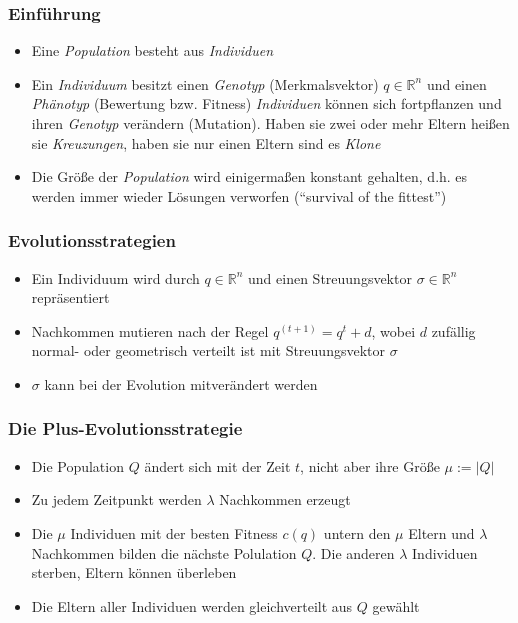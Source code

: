 \subsubsection{Einführung}
\begin{itemize}
	\item Eine \textit{Population} besteht aus \textit{Individuen}
	\item Ein \textit{Individuum} besitzt einen \textit{Genotyp} (Merkmalsvektor) \(q \in \mathbb{R}^n\) und einen \textit{Phänotyp} (Bewertung bzw. Fitness)
	\textit{Individuen} können sich fortpflanzen und ihren \textit{Genotyp} verändern (Mutation). Haben sie zwei oder mehr Eltern heißen sie \textit{Kreuzungen}, haben sie nur einen Eltern sind es \textit{Klone}
	\item Die Größe der \textit{Population} wird einigermaßen konstant gehalten, d.h. es werden immer wieder Lösungen verworfen ("`survival of the fittest"')
\end{itemize}

\subsubsection{Evolutionsstrategien}
\begin{itemize}
	\item Ein Individuum wird durch \(q \in \mathbb{R}^n\) und einen Streuungsvektor \(\sigma \in \mathbb{R}^n\) repräsentiert
	\item Nachkommen mutieren nach der Regel \(q^{(t+1)} = q^t+d\), wobei \(d\) zufällig normal- oder geometrisch verteilt ist mit Streuungsvektor \(\sigma\)
	\item \(\sigma\) kann bei der Evolution mitverändert werden
\end{itemize}

\subsubsection{Die Plus-Evolutionsstrategie}
\begin{itemize}
	\item Die Population \(Q\) ändert sich mit der Zeit \(t\), nicht aber ihre Größe \(\mu := |Q|\)
	\item Zu jedem Zeitpunkt werden \(\lambda\) Nachkommen erzeugt
	\item Die \(\mu\) Individuen mit der besten Fitness \(c(q)\) untern den \(\mu\) Eltern und \(\lambda\) Nachkommen bilden die nächste Polulation \(Q\). Die anderen \(\lambda\) Individuen sterben, Eltern können überleben
	\item Die Eltern aller Individuen werden gleichverteilt aus \(Q\) gewählt 
\end{itemize}

